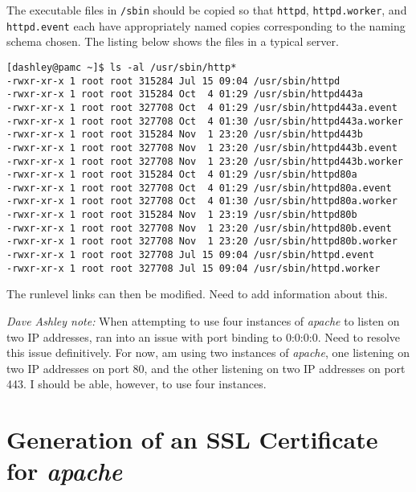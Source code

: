 The executable files in \texttt{/sbin} should 
be copied so that \texttt{httpd}, \texttt{httpd.worker}, and
\texttt{httpd.event} each have appropriately named copies corresponding
to the naming schema chosen.  The listing below shows the files
in a typical server.

\begin{small}
\begin{verbatim}
[dashley@pamc ~]$ ls -al /usr/sbin/http*
-rwxr-xr-x 1 root root 315284 Jul 15 09:04 /usr/sbin/httpd
-rwxr-xr-x 1 root root 315284 Oct  4 01:29 /usr/sbin/httpd443a
-rwxr-xr-x 1 root root 327708 Oct  4 01:29 /usr/sbin/httpd443a.event
-rwxr-xr-x 1 root root 327708 Oct  4 01:30 /usr/sbin/httpd443a.worker
-rwxr-xr-x 1 root root 315284 Nov  1 23:20 /usr/sbin/httpd443b
-rwxr-xr-x 1 root root 327708 Nov  1 23:20 /usr/sbin/httpd443b.event
-rwxr-xr-x 1 root root 327708 Nov  1 23:20 /usr/sbin/httpd443b.worker
-rwxr-xr-x 1 root root 315284 Oct  4 01:29 /usr/sbin/httpd80a
-rwxr-xr-x 1 root root 327708 Oct  4 01:29 /usr/sbin/httpd80a.event
-rwxr-xr-x 1 root root 327708 Oct  4 01:30 /usr/sbin/httpd80a.worker
-rwxr-xr-x 1 root root 315284 Nov  1 23:19 /usr/sbin/httpd80b
-rwxr-xr-x 1 root root 327708 Nov  1 23:20 /usr/sbin/httpd80b.event
-rwxr-xr-x 1 root root 327708 Nov  1 23:20 /usr/sbin/httpd80b.worker
-rwxr-xr-x 1 root root 327708 Jul 15 09:04 /usr/sbin/httpd.event
-rwxr-xr-x 1 root root 327708 Jul 15 09:04 /usr/sbin/httpd.worker
\end{verbatim}
\end{small}

The runlevel links can then be modified.  Need to add information about this.

\emph{Dave Ashley note:}
When attempting to use four instances of \emph{apache} to listen on two
IP addresses, ran into an issue with port binding to 0:0:0:0.  Need to
resolve this issue definitively.  For now, am using two instances of
\emph{apache}, one listening on two IP addresses on port 80, and the other
listening on two IP addresses on port 443.  I should be able, however, to use
four instances.


\section{Generation of an SSL Certificate for \emph{apache}}
\label{cist0:sgsl0}

